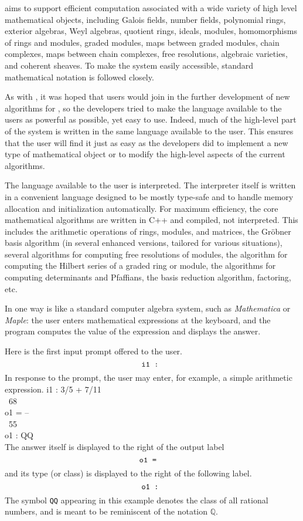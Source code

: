 \Mtwo aims to support efficient computation associated with a wide
variety of high level mathematical objects, including Galois fields,
number fields, polynomial rings, exterior algebras, Weyl algebras,
quotient rings, ideals, modules, homomorphisms of rings and modules,
graded modules, maps between graded modules, chain complexes, maps
between chain complexes, free resolutions, algebraic varieties, and
coherent sheaves.  To make the system easily accessible, standard 
mathematical notation is followed closely.

As with \Macaulay, it was hoped that users would join in the further
development of new algorithms for \Mtwo, so the developers
tried to make the language available to
the users as powerful as possible, yet easy to use.
Indeed, much of the high-level part of the system is written in the same language
available to the user.  This ensures that the user will find it just as easy
as the developers did to implement a new type of mathematical object or to
modify the high-level aspects of the current algorithms.

The language available to the user is interpreted.  The interpreter itself
is written in a convenient language designed to be mostly type-safe and to
handle memory allocation and initialization automatically.  For maximum
efficiency, the core mathematical algorithms are written in C++ and compiled,
not interpreted.  This includes the arithmetic operations of rings, modules,
and matrices, the Gr\"obner basis algorithm (in several enhanced versions,
tailored for various situations), several algorithms for computing free
resolutions of modules, the algorithm for computing the Hilbert series of a
graded ring or module, the algorithms for computing determinants and
Pfaffians, the basis reduction algorithm, factoring, etc.

In one way \Mtwo is like a standard computer algebra system, such as {\sl
Mathematica} or {\sl Maple}: the user enters
mathematical expressions at the keyboard, and the program computes the value
of the expression and displays the answer.

Here is the first input prompt offered to the user.
\[\text{\tt i1\ :\ }\]
In response to the prompt, the user may enter, for example, a simple arithmetic expression.
\beginOutput
i1 : 3/5 + 7/11\\
\emptyLine
\     68\\
o1 = --\\
\     55\\
\emptyLine
o1 : QQ\\
\endOutput
The answer itself is displayed to the right of the output
label \[\text{\tt o1\ = \ }\] and its type (or class) is displayed to the
right of the following label.
\[\text{\tt o1\ :\ }\]
The symbol {\tt QQ} appearing in this example 
denotes the class of all rational numbers, and is meant to be reminiscent of
the notation $\mathbb Q$.

